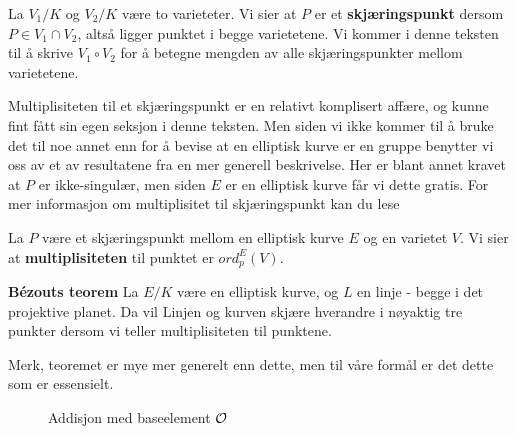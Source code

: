 \begin{definisjon}
La $V_1/K$ og $V_2/K$ være to varieteter. Vi sier at $P$ er et \textbf{skjæringspunkt} dersom $P \in V_1 \cap V_2$, altså ligger punktet i begge varietetene. Vi kommer i denne teksten til å skrive $V_1 \circ V_2$ for å betegne mengden av alle skjæringspunkter mellom varietetene.
\end{definisjon}

Multiplisiteten til et skjæringspunkt er en relativt komplisert affære, og kunne fint fått sin egen seksjon i denne teksten. Men siden vi ikke kommer til å bruke det til noe annet enn for å bevise at en elliptisk kurve er en gruppe benytter vi oss av et av resultatene fra en mer generell beskrivelse. Her er blant annet kravet at $P$ er ikke-singulær, men siden $E$ er en elliptisk kurve får vi dette gratis. For mer informasjon om multiplisitet til skjæringspunkt kan du lese \cite[3.3]{fulton}
\begin{definisjon}
La $P$ være et skjæringspunkt mellom en elliptisk kurve $E$ og en varietet $V$. Vi sier at \textbf{multiplisiteten} til punktet er $ord_p^{E}(V)$.
\end{definisjon}

\begin{teorem}
\textbf{Bézouts teorem} La $E/K$ være en elliptisk kurve, og $L$ en linje - begge i det projektive planet. Da vil Linjen og kurven skjære hverandre i nøyaktig tre punkter dersom vi teller multiplisiteten til punktene. 
\cite[5.3]{fulton}
\end{teorem}
Merk, teoremet er mye mer generelt enn dette, men til våre formål er det dette som er essensielt.

\begin{figure}[h!]
\centering
{}
\caption{Addisjon med baseelement $\mathcal{O}$}
\end{figure}

